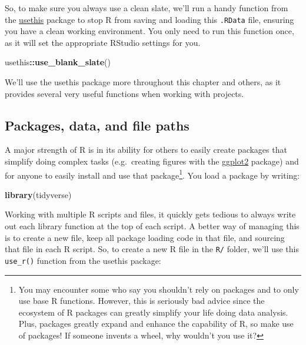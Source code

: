 \documentclass[]{Nemilov}
\newenvironment{Shaded}{\begin{snugshade}}{\end{snugshade}}
\newcommand{\KeywordTok}[1]{\textcolor[rgb]{0.13,0.29,0.53}{\textbf{#1}}}
\newcommand{\NormalTok}[1]{#1}
\newcommand{\OperatorTok}[1]{\textcolor[rgb]{0.81,0.36,0.00}{\textbf{#1}}}
\begin{document}
So, to make sure you always use a clean slate, we'll run a handy function from
the \href{https://usethis.r-lib.org/}{usethis} package to stop R from saving and loading this \texttt{.RData}
file, ensuring you have a clean working environment. You only need to run this function
once, as it will set the appropriate RStudio settings for you.

\begin{Shaded}
\begin{Highlighting}[]
\NormalTok{usethis}\OperatorTok{::}\KeywordTok{use_blank_slate}\NormalTok{()}
\end{Highlighting}
\end{Shaded}

We'll use the usethis package more throughout this chapter and others, as it provides
several very useful functions when working with projects.

\hypertarget{packages-data-and-file-paths}{%
\subsection{Packages, data, and file paths}\label{packages-data-and-file-paths}}

A major strength of R is in its ability for others to easily create packages
that simplify doing complex tasks (e.g.~creating figures with the
\href{https://ggplot2.tidyverse.org/}{ggplot2} package)
and for anyone to easily install and use that package\footnote{You may encounter some who say you shouldn't rely on packages and
  to only use base R functions. However, this is seriously bad advice since the
  ecosystem of R packages can greatly simplify your life doing data analysis.
  Plus, packages greatly expand and enhance the capability of R, so make use of
  packages! If someone invents a wheel, why wouldn't you use it?}.
You load a package by writing:

\begin{Shaded}
\begin{Highlighting}[]
\KeywordTok{library}\NormalTok{(tidyverse)}
\end{Highlighting}
\end{Shaded}

Working with multiple R scripts and files, it quickly gets tedious to always
write out each library function at the top of each script. A better way of
managing this is to create a new file, keep all package loading code in that
file, and sourcing that file in each R script. So, to create a new R file
in the \texttt{R/} folder, we'll use this \texttt{use\_r()} function from the usethis package:
\end{document}
